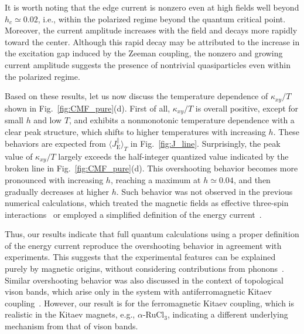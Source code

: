 \documentclass[twocolumn,superscriptaddress,showpacs, longbibliography, aps, prx]{revtex4-2}
\begin{document}
It is worth noting that the edge current is nonzero even at high fields well beyond $h_c \simeq 0.02$, i.e., within the polarized regime beyond the quantum critical point. 
Moreover, the current amplitude increases with the field and decays more rapidly toward the center. 
Although this rapid decay may be attributed to the increase in the excitation gap induced by the Zeeman coupling, the nonzero and growing current amplitude suggests the presence of nontrivial quasiparticles even within the polarized regime.

Based on these results, let us now discuss the temperature dependence of $\kappa_{xy}/T$ shown in Fig.~\ref{fig:CMF_pure}(d). First of all, $\kappa_{xy}/T$ is overall positive, except for small $h$ and low $T$, and exhibits a nonmonotonic temperature dependence with a clear peak structure, which shifts to higher temperatures with increasing $h$. 
These behaviors are expected from $\langle J_{\mathrm{E}}^\parallel \rangle_T$ in Fig.~\ref{fig:J_line}. 
Surprisingly, the peak value of $\kappa_{xy}/T$ largely exceeds the half-integer quantized value indicated by the broken line in Fig.~\ref{fig:CMF_pure}(d). 
This overshooting behavior becomes more pronounced with increasing $h$, reaching a maximum at $h\simeq 0.04$, and then gradually decreases at higher $h$. 
Such behavior was not observed in the previous numerical calculations, which treated the magnetic fields as effective three-spin interactions~\cite{NasuYM2017} or employed a simplified definition of the energy current~\cite{KumarT2023}. 

Thus, our results indicate that full quantum calculations using a proper definition of the energy current reproduce the overshooting behavior in agreement with experiments. 
This suggests that the experimental features can be explained purely by magnetic origins, without considering contributions from phonons~\cite{Ye2018Quantization,Vinkler2018}. 
Similar overshooting behavior was also discussed in the context of topological vison bands, which arise only in the system with antiferromagnetic Kitaev coupling~\cite{Joy2022}. 
However, our result is for the ferromagnetic Kitaev coupling, which is realistic in the Kitaev magnets, e.g., $\alpha$-RuCl$_3$, indicating a different underlying mechanism from that of vison bands. 
\end{document}
